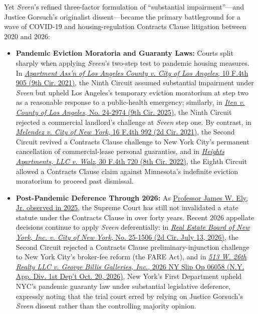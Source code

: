 \documentclass[12pt]{article}
\begin{document}
Yet \textit{Sveen}'s refined three-factor formulation of ``substantial impairment''---and Justice Gorsuch's originalist dissent---became the primary battleground for a wave of COVID-19 and housing-regulation Contracts Clause litigation between 2020 and 2026:
\begin{itemize}
  \item \textbf{Pandemic Eviction Moratoria and Guaranty Laws:} Courts split sharply when applying \textit{Sveen}'s two-step test to pandemic housing measures. In \href{https://law.justia.com/cases/federal/appellate-courts/ca9/20-56251/20-56251-2021-08-25.html}{\textit{Apartment Ass'n of Los Angeles County v. City of Los Angeles}, 10 F.4th 905 (9th Cir. 2021)}, the Ninth Circuit assumed substantial impairment under \textit{Sveen} but upheld Los Angeles's temporary eviction moratorium at step two as a reasonable response to a public-health emergency; similarly, in \href{https://www.gmsr.com/wp-content/uploads/2025/04/Iten-v.-County-of-LA-24-2974.pdf}{\textit{Iten v. County of Los Angeles}, No. 24-2974 (9th Cir. 2025)}, the Ninth Circuit rejected a commercial landlord's challenge at \textit{Sveen} step one. By contrast, in \href{https://www.govinfo.gov/content/pkg/USCOURTS-ca2-20-04238/pdf/USCOURTS-ca2-20-04238-0.pdf}{\textit{Melendez v. City of New York}, 16 F.4th 992 (2d Cir. 2021)}, the Second Circuit revived a Contracts Clause challenge to New York City's permanent cancellation of commercial-lease personal guaranties, and in \href{https://law.justia.com/cases/federal/appellate-courts/ca8/21-1278/21-1278-2022-04-05.html}{\textit{Heights Apartments, LLC v. Walz}, 30 F.4th 720 (8th Cir. 2022)}, the Eighth Circuit allowed a Contracts Clause claim against Minnesota's indefinite eviction moratorium to proceed past dismissal.
  \item \textbf{Post-Pandemic Deference Through 2026:} As \href{https://scholarship.law.wm.edu/cgi/viewcontent.cgi?filename=3&article=1014&context=propertyjournal&type=additional}{Professor James W. Ely, Jr. observed in 2025}, the Supreme Court has still not invalidated a state statute under the Contracts Clause in over forty years. Recent 2026 appellate decisions continue to apply \textit{Sveen} deferentially: in \href{https://law.justia.com/cases/federal/appellate-courts/ca2/25-1506/25-1506-2026-07-13.html}{\textit{Real Estate Board of New York, Inc. v. City of New York}, No. 25-1506 (2d Cir. July 13, 2026)}, the Second Circuit rejected a Contracts Clause preliminary-injunction challenge to New York City's broker-fee reform (the FARE Act), and in \href{https://law.justia.com/cases/new-york/appellate-division-first-department/2026/index-no-160266-20-appeal-no-5735-case-no-2025-00996.html}{\textit{513 W. 26th Realty LLC v. George Billis Galleries, Inc.}, 2026 NY Slip Op 06058 (N.Y. App. Div. 1st Dep't Oct. 20, 2026)}, New York's First Department upheld NYC's pandemic guaranty law under substantial legislative deference, expressly noting that the trial court erred by relying on Justice Gorsuch's \textit{Sveen} dissent rather than the controlling majority opinion.
\end{itemize}
\end{document}
